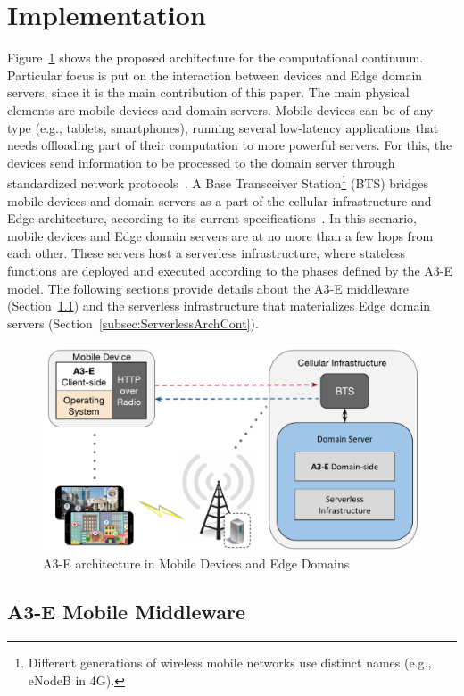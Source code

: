 \section{Implementation}

Figure~\ref{fig:abstract-architecture} shows the proposed architecture for the computational continuum. Particular focus is put on the interaction between devices and Edge domain servers, since it is the main contribution of this paper. 
The main physical elements are mobile devices and domain servers. Mobile devices can be of any type (e.g., tablets, smartphones), running several low-latency applications that needs offloading part of their computation to more powerful servers. For this, the devices send information to be processed to the domain server through standardized network protocols~\cite{Sill17standards}.  A Base Transceiver Station\footnote{Different generations of wireless mobile networks use distinct names (e.g., eNodeB in 4G).} (BTS) bridges mobile devices and domain servers as a part of the cellular infrastructure and  Edge architecture, according to its current specifications~\cite{hu2015mobile}. In this scenario, mobile devices and Edge domain servers are at no more than a few hops from each other. These servers host a serverless infrastructure, where stateless functions are deployed and executed according to the phases defined by the A3-E model. 
The following sections provide details about the A3-E middleware (Section~\ref{subsec:A3-E}) and the serverless infrastructure that materializes Edge domain servers (Section~\ref{subsec:ServerlessArchCont}).


\begin{figure}[tbp]
	\includegraphics[width=.7\textwidth]{figs/Continuum_EdgeArch}
	\caption{A3-E architecture in Mobile Devices and Edge Domains}
	\label{fig:abstract-architecture}
\end{figure}

\subsection{A3-E Mobile Middleware}
\label{subsec:A3-E}

